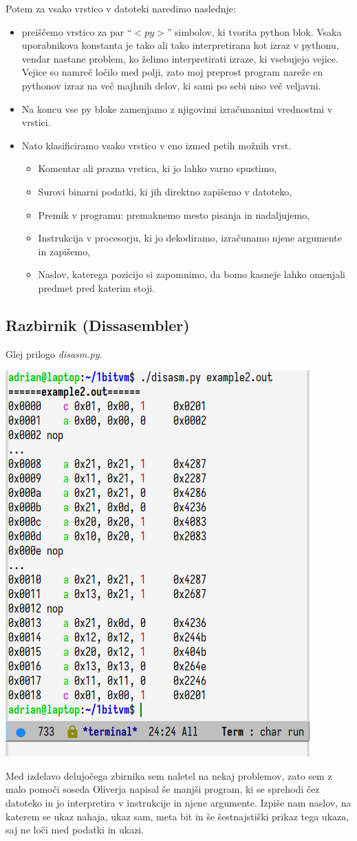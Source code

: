 \documentclass[12pt]{article}
\begin{document}
Potem za vsako vrstico v datoteki naredimo naslednje:
\begin{itemize}
  \item preiščemo vrstico za par ``$<py>$'' simbolov, ki tvorita python blok.
  Vsaka uporabnikova konstanta je tako ali tako interpretirana kot izraz v pythonu, vendar nastane problem, ko želimo interpretirati izraze, ki vsebujejo vejice.
  Vejice so namreč ločilo med polji, zato moj preprost program nareže en pythonov izraz na več majhnih delov, ki sami po sebi niso več veljavni.
  \item Na koncu vse py bloke zamenjamo z njigovimi izračunanimi vrednostmi v vrstici.
  \item Nato klasificiramo vsako vrstico v eno izmed petih možnih vrst.
  \begin{itemize}
    \item Komentar ali prazna vrstica, ki jo lahko varno spustimo,
    \item Surovi binarni podatki, ki jih direktno zapišemo v datoteko,
    \item Premik v programu: premaknemo mesto pisanja in nadaljujemo,
    \item Instrukcija v procesorju, ki jo dekodiramo, izračunamo njene argumente in zapišemo,
    \item Naslov, katerega pozicijo si zapomnimo, da bomo kasneje lahko omenjali predmet pred katerim stoji.
  \end{itemize}
\end{itemize}

\subsection{Razbirnik (Dissasembler)}
Glej prilogo \textit{disasm.py}.

\begin{center}
  \includegraphics[width=.3\linewidth]{slike/razbirnik.png}
\end{center}
Med izdelavo delujočega zbirnika sem naletel na nekaj problemov, zato sem z malo pomoči soseda Oliverja napisal še manjši program, ki se sprehodi čez datoteko in jo interpretira v instrukcije in njene argumente.
Izpiše nam naslov, na katerem se ukaz nahaja, ukaz sam, meta bit in še šestnajstiški prikaz tega ukaza, saj ne loči med podatki in ukazi.
\end{document}
